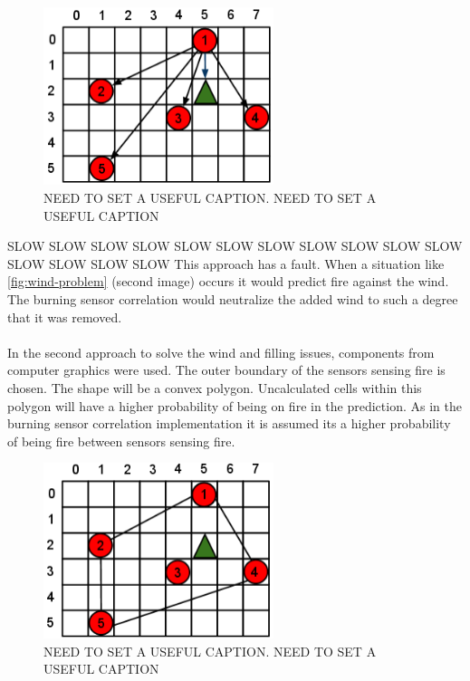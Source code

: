 \begin{figure}[here]
  \centering
      \includegraphics[width=0.6\textwidth]{solution/graphics/burning-sensor-correlation.png}
  \caption{NEED TO SET A USEFUL CAPTION. NEED TO SET A USEFUL CAPTION}
  \label{fig:burning-sensor-correlation}
\end{figure}
SLOW SLOW SLOW SLOW SLOW SLOW SLOW SLOW SLOW SLOW SLOW SLOW SLOW SLOW SLOW 
This approach has a fault. When a situation like \ref{fig:wind-problem} (second image) occurs it would predict fire against the wind. The burning sensor correlation would neutralize the added wind to such a degree that it was removed.
\\\\
In the second approach to solve the wind and filling issues, components from computer graphics were used. The outer boundary of the sensors sensing fire is chosen. The shape will be a convex polygon. Uncalculated cells within this polygon will have a higher probability of being on fire in the prediction. As in the burning sensor correlation implementation it is assumed its a higher probability of being fire between sensors sensing fire.
\begin{figure}[here]
  \centering
      \includegraphics[width=0.6\textwidth]{solution/graphics/graphical-boundary.png}
  \caption{NEED TO SET A USEFUL CAPTION. NEED TO SET A USEFUL CAPTION}
  \label{fig:graphical-boundary}
\end{figure}

